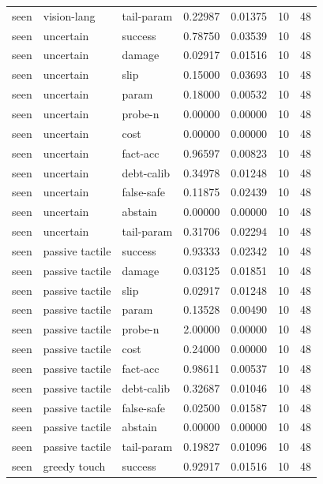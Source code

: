 \documentclass{article}
\begin{document}
\begin{center}
\begin{longtable}{lllllll}
seen & vision-lang & tail-param & 0.22987 & 0.01375 & 10 & 48 \\
seen & uncertain & success & 0.78750 & 0.03539 & 10 & 48 \\
seen & uncertain & damage & 0.02917 & 0.01516 & 10 & 48 \\
seen & uncertain & slip & 0.15000 & 0.03693 & 10 & 48 \\
seen & uncertain & param & 0.18000 & 0.00532 & 10 & 48 \\
seen & uncertain & probe-n & 0.00000 & 0.00000 & 10 & 48 \\
seen & uncertain & cost & 0.00000 & 0.00000 & 10 & 48 \\
seen & uncertain & fact-acc & 0.96597 & 0.00823 & 10 & 48 \\
seen & uncertain & debt-calib & 0.34978 & 0.01248 & 10 & 48 \\
seen & uncertain & false-safe & 0.11875 & 0.02439 & 10 & 48 \\
seen & uncertain & abstain & 0.00000 & 0.00000 & 10 & 48 \\
seen & uncertain & tail-param & 0.31706 & 0.02294 & 10 & 48 \\
seen & passive tactile & success & 0.93333 & 0.02342 & 10 & 48 \\
seen & passive tactile & damage & 0.03125 & 0.01851 & 10 & 48 \\
seen & passive tactile & slip & 0.02917 & 0.01248 & 10 & 48 \\
seen & passive tactile & param & 0.13528 & 0.00490 & 10 & 48 \\
seen & passive tactile & probe-n & 2.00000 & 0.00000 & 10 & 48 \\
seen & passive tactile & cost & 0.24000 & 0.00000 & 10 & 48 \\
seen & passive tactile & fact-acc & 0.98611 & 0.00537 & 10 & 48 \\
seen & passive tactile & debt-calib & 0.32687 & 0.01046 & 10 & 48 \\
seen & passive tactile & false-safe & 0.02500 & 0.01587 & 10 & 48 \\
seen & passive tactile & abstain & 0.00000 & 0.00000 & 10 & 48 \\
seen & passive tactile & tail-param & 0.19827 & 0.01096 & 10 & 48 \\
seen & greedy touch & success & 0.92917 & 0.01516 & 10 & 48 \\
\bottomrule
\end{longtable}
\renewcommand{\arraystretch}{1.0}
\end{center}
\end{document}
